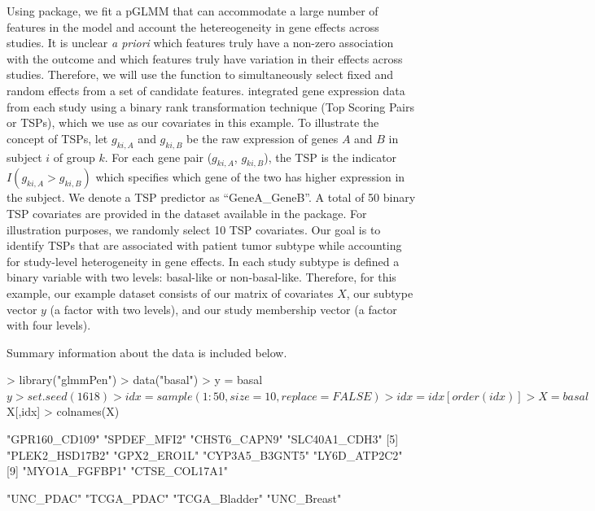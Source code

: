 Using  package, we fit a pGLMM that can accommodate a large number of features in the model and account the hetereogeneity in gene effects across studies.  It is unclear \textit{a priori} which features truly have a non-zero association with the outcome and which features truly have variation in their effects across studies. Therefore, we will use the  function to simultaneously select fixed and random effects from a set of candidate features. \cite{rashid2020} integrated gene expression data from each study using a binary rank transformation technique (Top Scoring Pairs or TSPs), which we use as our covariates in this example. To illustrate the concept of TSPs, let $g_{ki,A}$ and $g_{ki,B}$ be the raw expression of genes $A$ and $B$ in subject $i$ of group $k$. For each gene pair ($g_{ki,A}$, $g_{ki,B}$), the TSP is the indicator $I(g_{ki,A} > g_{ki,B})$ which specifies which gene of the two has higher expression in the subject. We denote a TSP predictor as ``GeneA\_GeneB''.  A total of 50 binary TSP covariates are provided in the  dataset available in the package. For illustration purposes, we randomly select 10 TSP covariates. Our goal is to identify TSPs that are associated with patient tumor subtype while accounting for study-level heterogeneity in gene effects.  In each study subtype is defined a binary variable with two levels: basal-like or non-basal-like.  Therefore, for this example, our example dataset consists of our matrix of covariates $X$, our subtype vector $y$ (a factor with two levels), and our study membership vector (a factor with four levels). 

\newpage
Summary information about the data is included below.

\begin{example}
> library("glmmPen")
> data("basal")
> y = basal$y
> set.seed(1618)
> idx = sample(1:50, size = 10, replace = FALSE)
> idx = idx[order(idx)]
> X = basal$X[,idx]
> colnames(X)
\end{example}
\begin{example}
[1] "GPR160_CD109"   "SPDEF_MFI2"    "CHST6_CAPN9"   "SLC40A1_CDH3"  
[5] "PLEK2_HSD17B2"  "GPX2_ERO1L"    "CYP3A5_B3GNT5" "LY6D_ATP2C2"   
[9] "MYO1A_FGFBP1"   "CTSE_COL17A1"  
\end{example}

\begin{example}
[1] "UNC_PDAC"     "TCGA_PDAC"    "TCGA_Bladder" "UNC_Breast"  
\end{example}

